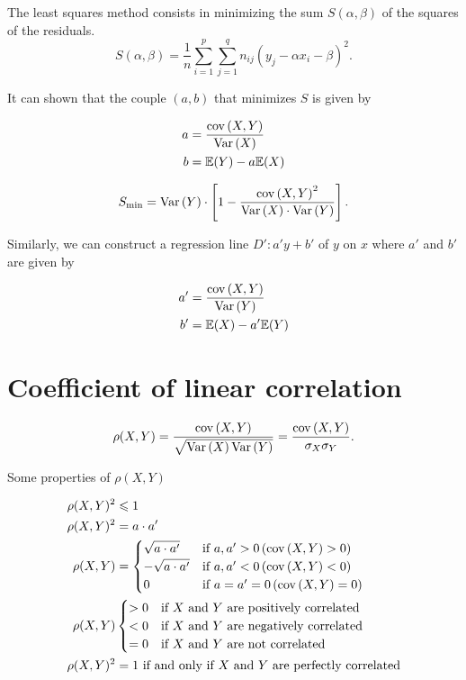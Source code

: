 \documentclass{report}
\begin{document}
The least squares method consists in minimizing the sum $S(\alpha,\beta)$ of the squares of the residuals.\\

\[
	S(\alpha,\beta) = \frac{1}{n} \sum_{i=1}^p \sum_{j=1}^q n_{ij}(y_j - \alpha x_i - \beta)^2
	.\]

It can shown that the couple $(a,b)$ that minimizes $S$ is given by

\begin{align*}
	a & = \frac{\mathrm{cov}\left( X,Y \right)}{\mathrm{Var}\left( X \right)} \\
	b & = \mathbb{E}(Y) - a\mathbb{E}(X)
\end{align*}

\[
	S_{\min} = \mathrm{Var}\left( Y \right)\cdot\left[ 1 - \frac{\mathrm{cov}\left( X,Y \right)^2}{\mathrm{Var}\left( X \right)\cdot\mathrm{Var}\left( Y \right)} \right]
	.\]

Similarly, we can construct a regression line $D': a'y + b'$ of $y$ on $x$ where $a'$ and $b'$ are given by

\begin{align*}
	a' & = \frac{\mathrm{cov}\left( X,Y \right)}{\mathrm{Var}\left( Y \right)} \\
	b' & = \mathbb{E}(X) - a'\mathbb{E}(Y)
\end{align*}

\section{Coefficient of linear correlation}

\[
	\rho(X,Y) = \frac{\mathrm{cov}\left( X,Y \right)}{\sqrt{\mathrm{Var}\left( X \right)\mathrm{Var}\left( Y \right)}} = \frac{\mathrm{cov}\left( X,Y \right)}{\sigma_X\sigma_Y}
	.\]

Some properties of $\rho(X,Y)$

\begin{align*}
	\rho(X,Y)^2 & \leqslant 1                                                                        \\
	\rho(X,Y)^2 & = a\cdot a'                                                                   \\
	\rho(X,Y)   & = \begin{cases}
		                \sqrt{a\cdot a'}  & \text{if } a, a' > 0 \,(\mathrm{cov}\left( X,Y \right) > 0)  \\
		                -\sqrt{a\cdot a'} & \text{if } a, a' < 0 \,(\mathrm{cov}\left( X,Y \right) < 0)  \\
		                0                 & \text{if } a = a' = 0 \,(\mathrm{cov}\left( X,Y \right) = 0)
	                \end{cases}                 \\
	\rho(X,Y)   & \begin{cases}
		              > 0 & \text{if } X \text{ and } Y \text{ are positively correlated} \\
		              < 0 & \text{if } X \text{ and } Y \text{ are negatively correlated} \\
		              = 0 & \text{if } X \text{ and } Y \text{ are not correlated}
	              \end{cases}\\
	\rho(X,Y)^2 & = 1 \text{ if and only if } X \text{ and } Y \text{ are perfectly correlated}
\end{align*}
\end{document}
